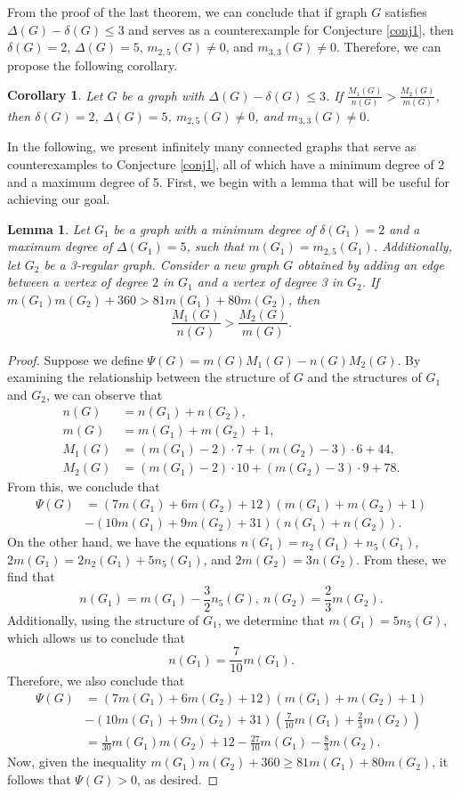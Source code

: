 \documentclass[12pt]{article}
\newtheorem{corollary}[theorem]{Corollary}
\newtheorem{lemma}[theorem]{Lemma}
\begin{document}
From the proof of the last theorem, we can conclude that if graph $G$ satisfies $\Delta(G) - \delta(G) \leq 3$ and serves as a counterexample for Conjecture \ref{conj1}, then $\delta(G) = 2$, $\Delta(G) = 5$, $m_{2,5}(G) \neq 0$, and $m_{3,3}(G) \neq 0$. Therefore, we can propose the following corollary.

\begin{corollary}
Let $G$ be a graph with $\Delta(G)-\delta(G)\leq3$. If $\frac{M_1(G)}{n(G)}>\frac{M_2(G)}{m(G)}$, then $\delta(G)=2$, $\Delta(G)=5$, $m_{2,5}(G)\neq0$, and $m_{3,3}(G)\neq0$.
\end{corollary}

In the following, we present infinitely many connected graphs that serve as counterexamples to Conjecture \ref{conj1}, all of which have a minimum degree of 2 and a maximum degree of 5. First, we begin with a lemma that will be useful for achieving our goal.
\begin{lemma}\label{lm1}
Let $ G_1 $ be a graph with a minimum degree of $ \delta(G_1) = 2 $ and a maximum degree of $ \Delta(G_1) = 5 $, such that $ m(G_1) = m_{2,5}(G_1) $. Additionally, let $ G_2 $ be a 3-regular graph. Consider a new graph $ G $ obtained by adding an edge between a vertex of degree $2$ in $ G_1 $ and a vertex of degree 3 in $ G_2 $. If $m(G_1)m(G_2)+360>81m(G_1)+80m(G_2)$, then 
 \[\frac{M_1(G)}{n(G)} > \frac{M_2(G)}{m(G)}.\]
\end{lemma} 
\begin{proof}
Suppose we define $\Psi(G) = m(G)M_1(G) - n(G)M_2(G)$. By examining the relationship between the structure of $G$ and the structures of $G_1$ and $G_2$, we can observe that
\begin{align*}
n(G) &= n(G_1) + n(G_2),\\
m(G)& = m(G_1) + m(G_2) + 1,\\
M_1(G) &= (m(G_1) - 2) \cdot 7 + (m(G_2) - 3) \cdot 6 + 44,\\
M_2(G) &= (m(G_1) - 2) \cdot 10 + (m(G_2) - 3) \cdot 9 + 78.
\end{align*}
From this, we conclude that
\begin{align*}
 \Psi(G)& =(7m(G_1)+6m(G_2)+12)(m(G_1)+m(G_2)+1)\\
  &-(10m(G_1)+9m(G_2)+31)(n(G_1)+n(G_2)).
\end{align*} 
On the other hand, we have the equations $n(G_1) = n_2(G_1) + n_5(G_1)$, $2m(G_1) = 2n_2(G_1) + 5n_5(G_1)$, and $2m(G_2) = 3n(G_2)$. From these, we find that
\[n(G_1) = m(G_1) - \frac{3}{2}n_5(G),~n(G_2) = \frac{2}{3} m(G_2).\]
Additionally, using the structure of $G_1$, we determine that $m(G_1) = 5n_5(G)$, which allows us to conclude that \[n(G_1) = \frac{7}{10}m(G_1).\] Therefore, we also conclude that 
\begin{align*}
 \Psi(G)& =(7m(G_1)+6m(G_2)+12)(m(G_1)+m(G_2)+1)\\
  &-(10m(G_1)+9m(G_2)+31)(\frac{7}{10}m(G_1)+\frac{2}{3} m(G_2))\\
  &=\frac{1}{30}m(G_1)m(G_2)+12-\frac{27}{10}m(G_1)-\frac{8}{3}m(G_2).
\end{align*} 
Now, given the inequality $m(G_1)m(G_2) + 360 \geq 81m(G_1) + 80m(G_2)$, it follows that $\Psi(G) > 0$, as desired.
\end{proof} 
\end{document}
